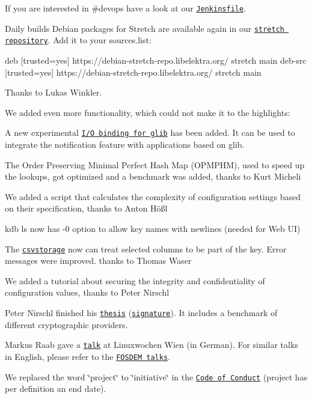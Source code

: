 If you are interested in {\ttfamily \#devops} have a look at our \href{https://github.com/ElektraInitiative/libelektra/blob/master/scripts/jenkins/Jenkinsfile}{\tt Jenkinsfile}.

Daily builds Debian packages for Stretch are available again in our \href{https://debian-stretch-repo.libelektra.org}{\tt stretch repository}. Add it to your {\ttfamily sources.\+list}\+:


\begin{DoxyCode}
deb     [trusted=yes] https://debian-stretch-repo.libelektra.org/ stretch main
deb-src [trusted=yes] https://debian-stretch-repo.libelektra.org/ stretch main
\end{DoxyCode}


Thanks to Lukas Winkler.

We added even more functionality, which could not make it to the highlights\+:


\begin{DoxyItemize}
\item A new experimental \href{https://www.libelektra.org/bindings/io_glib}{\tt I/O binding for glib} has been added. It can be used to integrate the notification feature with applications based on glib.
\item The Order Preserving Minimal Perfect Hash Map (O\+P\+M\+P\+HM), used to speed up the lookups, got optimized and a benchmark was added, thanks to Kurt Micheli
\item We added a script that calculates the complexity of configuration settings based on their specification, thanks to Anton Hößl
\item {\ttfamily kdb ls} now has {\ttfamily -\/0} option to allow key names with newlines (needed for Web UI)
\item The \href{https://www.libelektra.org/plugins/csvstorage}{\tt csvstorage} now can treat selected columns to be part of the key. Error messages were improved. thanks to Thomas Waser
\end{DoxyItemize}


\begin{DoxyItemize}
\item We added a tutorial about securing the integrity and confidentiality of configuration values, thanks to Peter Nirschl
\item Peter Nirschl finished his \href{https://www.libelektra.org/ftp/elektra/publications/nirschl2018cryptographic.pdf}{\tt thesis} (\href{https://www.libelektra.org/ftp/elektra/publications/nirschl2018cryptographic.pdf.sig}{\tt signature}). It includes a benchmark of different cryptographic providers.
\item Markus Raab gave a \href{https://cfp.linuxwochen.at/de/LWW18/public/events/798}{\tt talk} at Linuxwochen Wien (in German). For similar talks in English, please refer to the \href{https://fosdem.org/2018/schedule/speaker/markus_raab/}{\tt F\+O\+S\+D\+EM talks}.
\item We replaced the word \char`\"{}project\char`\"{} to \char`\"{}initiative\char`\"{} in the \href{https://www.libelektra.org/devgettingstarted/code-of-conduct}{\tt Code of Conduct} (project has per definition an end date).
\end{DoxyItemize}

